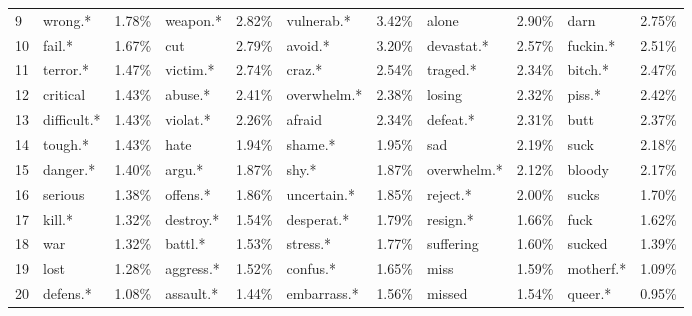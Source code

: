 \begin{table}[h]
\begin{adjustbox}{width=\linewidth, center}
\begin{tabular}{lllllllllll}
	9                    &          wrong.* &     1.78\% &           weapon.* &           2.82\% &   vulnerab.* &     3.42\% &         alone &     2.90\% &             darn &            2.75\% \\
	10                   &           fail.* &     1.67\% &                cut &           2.79\% &      avoid.* &     3.20\% &    devastat.* &     2.57\% &         fuckin.* &            2.51\% \\
	11                   &         terror.* &     1.47\% &           victim.* &           2.74\% &       craz.* &     2.54\% &      traged.* &     2.34\% &          bitch.* &            2.47\% \\
	12                   &         critical &     1.43\% &            abuse.* &           2.41\% &  overwhelm.* &     2.38\% &        losing &     2.32\% &           piss.* &            2.42\% \\
	13                   &      difficult.* &     1.43\% &           violat.* &           2.26\% &       afraid &     2.34\% &      defeat.* &     2.31\% &             butt &            2.37\% \\
	14                   &          tough.* &     1.43\% &               hate &           1.94\% &      shame.* &     1.95\% &           sad &     2.19\% &             suck &            2.18\% \\
	15                   &         danger.* &     1.40\% &             argu.* &           1.87\% &        shy.* &     1.87\% &   overwhelm.* &     2.12\% &           bloody &            2.17\% \\
	16                   &          serious &     1.38\% &           offens.* &           1.86\% &  uncertain.* &     1.85\% &      reject.* &     2.00\% &            sucks &            1.70\% \\
	17                   &           kill.* &     1.32\% &          destroy.* &           1.54\% &   desperat.* &     1.79\% &      resign.* &     1.66\% &             fuck &            1.62\% \\
	18                   &              war &     1.32\% &            battl.* &           1.53\% &     stress.* &     1.77\% &     suffering &     1.60\% &           sucked &            1.39\% \\
	19                   &             lost &     1.28\% &          aggress.* &           1.52\% &     confus.* &     1.65\% &          miss &     1.59\% &        motherf.* &            1.09\% \\
	20                   &         defens.* &     1.08\% &          assault.* &           1.44\% &  embarrass.* &     1.56\% &        missed &     1.54\% &          queer.* &            0.95\% \\

\end{tabular}
\end{adjustbox}
\end{table}
